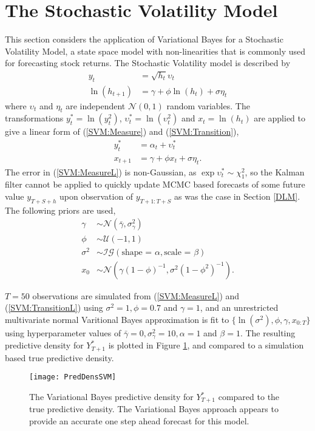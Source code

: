 \documentclass[12pt,a4paper]{article}%
\numberwithin{equation}{section}
\begin{document}
\section{The Stochastic Volatility Model}
\label{SVM}

This section considers the application of Variational Bayes for a Stochastic Volatility Model, a state space model with non-linearities that is commonly used for forecasting stock returns. The Stochastic Volatility model is described by
\begin{align}
y_t &= \sqrt{h_t} \upsilon_t \label{SVM:Measure} \\
\ln (h_{t+1}) &= \gamma + \phi \ln (h_t) + \sigma \eta_t \label{SVM:Transition}
\end{align}
where $\upsilon_t$ and $\eta_t$ are independent $\mathcal{N}(0, 1)$ random variables. The transformations $y_t^* = \ln(y_t^2)$, $\upsilon_t^* = \ln(\upsilon_t^2)$ and $x_t = \ln(h_t)$ are applied to give a linear form of (\ref{SVM:Measure}) and (\ref{SVM:Transition}),
\begin{align}
y_t^* &= \alpha_t + \upsilon_t^* \label{SVM:MeasureL} \\
x_{t+1} &= \gamma + \phi x_t + \sigma \eta_t \label{SVM:TransitionL}.
\end{align}
The error in (\ref{SVM:MeasureL}) is non-Gaussian, as $\exp{\upsilon_t^*} \sim \chi^2_1$, so the Kalman filter cannot be applied to quickly update MCMC based forecasts of some future value $y_{T+S+h}$ upon observation of $y_{T+1:T+S}$ as was the case in Section \ref{DLM}.
The following priors are used,
\begin{align}
\gamma &\sim \mathcal{N}(\bar{\gamma}, \sigma^2_{\gamma}) \\
\phi &\sim \mathcal{U}(-1, 1) \\
\sigma^2 &\sim \mathcal{IG}(\mbox{shape = }\alpha, \mbox{scale = }\beta) \\
x_0 &\sim \mathcal{N}(\gamma(1-\phi)^{-1}, \sigma^2(1 - \phi^2)^{-1}).
\end{align}

$T = 50$ observations are simulated from (\ref{SVM:MeasureL}) and (\ref{SVM:TransitionL}) using $\sigma^2 = 1, \phi = 0.7$ and $\gamma = 1$, and an unrestricted multivariate normal Varitional Bayes approximation is fit to $\{\ln(\sigma^2), \phi, \gamma, x_{0:T}\}$ using hyperparameter values of $\bar{\gamma} = 0, \sigma^2_{\gamma} = 10, \alpha = 1$ and $\beta = 1$. The resulting predictive density for $Y_{T+1}^*$ is plotted in Figure \ref{fig:SVMpreddens}, and compared to a simulation based true predictive density.
\begin{figure}[h]
\centering
\texttt{[image: PredDensSVM]}
\caption{The Variational Bayes predictive density for $Y_{T+1}^*$ compared to the true predictive density. The Variational Bayes approach appears to provide an accurate one step ahead forecast for this model.}
\label{fig:SVMpreddens}
\end{figure}
\end{document}
